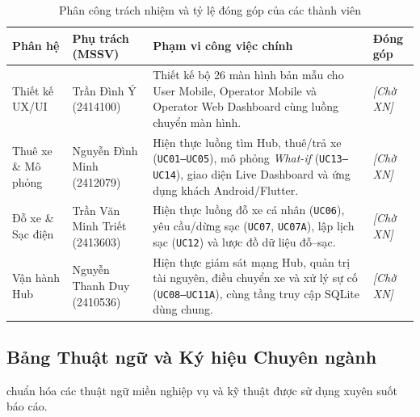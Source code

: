 \begin{table}[H]
\centering\small
\caption{Phân công trách nhiệm và tỷ lệ đóng góp của các thành viên}
\label{tab:team-ownership}
\begin{tabularx}{\textwidth}{>{\raggedright\arraybackslash}p{2.5cm} >{\raggedright\arraybackslash}p{2.6cm} >{\raggedright\arraybackslash}X >{\centering\arraybackslash}p{1.6cm}}
\toprule
\textbf{Phân hệ} & \textbf{Phụ trách (MSSV)} & \textbf{Phạm vi công việc chính} & \textbf{Đóng góp} \\
\midrule
Thiết kế UX/UI & Trần Đình Ý (2414100) & Thiết kế bộ 26 màn hình bản mẫu cho User Mobile, Operator Mobile và Operator Web Dashboard cùng luồng chuyển màn hình. & \textit{[Chờ XN]} \\
\addlinespace[4pt]
Thuê xe \& Mô phỏng & Nguyễn Đình Minh (2412079) & Hiện thực luồng tìm Hub, thuê/trả xe (\texttt{UC01--UC05}), mô phỏng \textit{What-if} (\texttt{UC13--UC14}), giao diện Live Dashboard và ứng dụng khách Android/Flutter. & \textit{[Chờ XN]} \\
\addlinespace[4pt]
Đỗ xe \& Sạc điện & Trần Văn Minh Triết (2413603) & Hiện thực luồng đỗ xe cá nhân (\texttt{UC06}), yêu cầu/dừng sạc (\texttt{UC07}, \texttt{UC07A}), lập lịch sạc (\texttt{UC12}) và lược đồ dữ liệu đỗ--sạc. & \textit{[Chờ XN]} \\
\addlinespace[4pt]
Vận hành Hub & Nguyễn Thanh Duy (2410536) & Hiện thực giám sát mạng Hub, quản trị tài nguyên, điều chuyển xe và xử lý sự cố (\texttt{UC08--UC11A}), cùng tầng truy cập SQLite dùng chung. & \textit{[Chờ XN]} \\
\bottomrule
\end{tabularx}
\end{table}

\subsection*{Bảng Thuật ngữ và Ký hiệu Chuyên ngành}

 chuẩn hóa các thuật ngữ miền nghiệp vụ và kỹ thuật được sử dụng xuyên suốt báo cáo.


